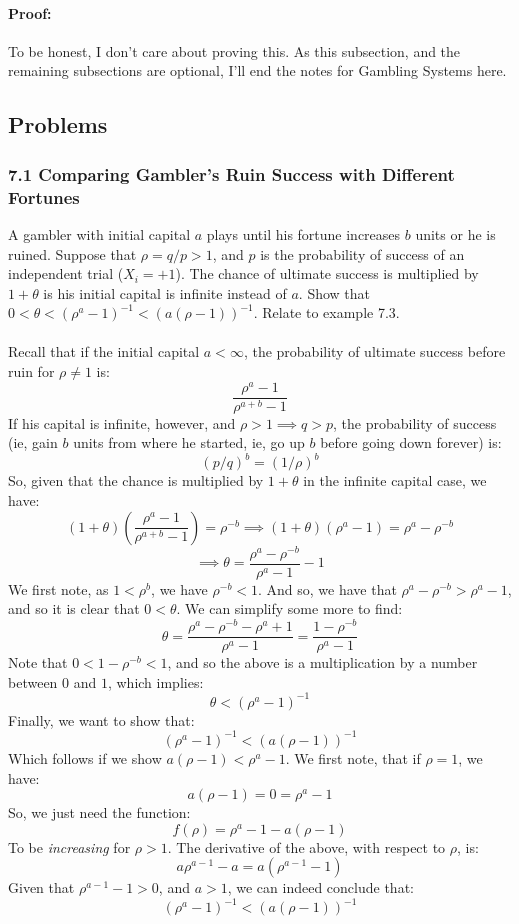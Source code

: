 \documentclass[12pt,a4paper]{article}
\newcommand{\1}[1]{\mathbbm{1}\left\{ #1 \right\}}
\begin{document}
\paragraph{Proof:} To be honest, I don't care about proving this. As this subsection, and the remaining subsections are optional, I'll end the notes for Gambling Systems here.

\subsection{Problems}
\subsubsection{7.1 Comparing Gambler's Ruin Success with Different Fortunes} A gambler with initial capital $a$ plays until his fortune increases $b$ units or he is ruined. Suppose that $\rho = q/p > 1$, and $p$ is the probability of success of an independent trial ($X_i = +1$). The chance of ultimate success is multiplied by $1 + \theta$ is his initial capital is infinite instead of $a$. Show that $0 < \theta < (\rho^a - 1)^{-1} < (a(\rho - 1))^{-1}$. Relate to example 7.3.
\\\\
Recall that if the initial capital $a < \infty$, the probability of ultimate success before ruin for $\rho \neq 1$ is:
$$
	\frac{\rho^a - 1}{\rho^{a + b} - 1}
$$
If his capital is infinite, however, and $\rho > 1 \implies q > p$, the probability of success (ie, gain $b$ units from where he started, ie, go up $b$ before going down forever) is:
$$
	(p/q)^b = (1/\rho)^b
$$
So, given that the chance is multiplied by $1 + \theta$ in the infinite capital case, we have:
$$
	(1 + \theta)\left(\frac{\rho^a - 1}{\rho^{a + b} - 1}\right) = \rho^{-b} \implies
	(1 + \theta)(\rho^a - 1) = \rho^a - \rho^{-b}
$$
$$
	\implies
	\theta = \frac{\rho^a - \rho^{-b}}{\rho^a - 1} - 1
$$
We first note, as $1 < \rho^b$, we have $\rho^{-b} < 1$. And so, we have that $\rho^a - \rho^{-b} > \rho^a - 1$, and so it is clear that $0 < \theta$. We can simplify some more to find:
$$
	\theta = \frac{\rho^a - \rho^{-b} - \rho^a + 1}{\rho^a - 1} = \frac{1 - \rho^{-b}}{\rho^a - 1}
$$
Note that $0 < 1 - \rho^{-b} < 1$, and so the above is a multiplication by a number between $0$ and $1$, which implies:
$$
	\theta < (\rho^a - 1)^{-1}
$$
Finally, we want to show that:
$$
	(\rho^a - 1)^{-1} < (a(\rho - 1))^{-1}
$$
Which follows if we show $a(\rho - 1) < \rho^a - 1$. We first note, that if $\rho = 1$, we have:
$$
	a (\rho - 1) = 0 = \rho^a - 1
$$
So, we just need the function:
$$
	f(\rho) = \rho^a - 1 - a(\rho - 1)
$$
To be \textit{increasing} for $\rho > 1$. The derivative of the above, with respect to $\rho$, is:
$$
	a\rho^{a-1} - a = a(\rho^{a-1} - 1)
$$
Given that $\rho^{a-1} - 1 > 0$, and $a > 1$, we can indeed conclude that:
$$
	(\rho^a - 1)^{-1} < (a(\rho - 1))^{-1}
$$
\end{document}
